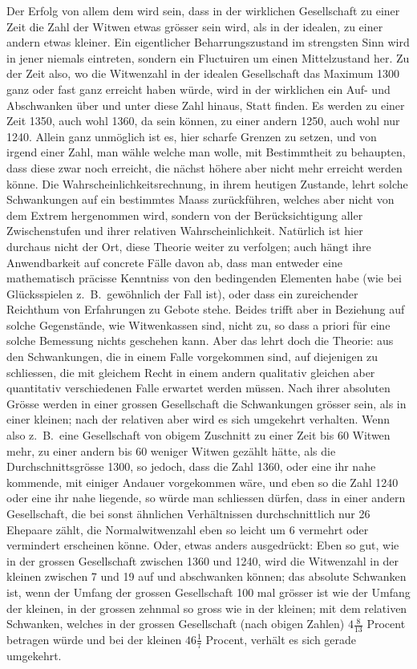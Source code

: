 \documentclass[12pt,a4paper]{article}
\begin{document}
Der Erfolg von allem dem wird sein, dass in der wirklichen Gesellschaft zu einer Zeit die Zahl der Witwen etwas gr\"osser sein wird, als in der idealen, zu einer andern etwas kleiner. Ein eigentlicher Beharrungszustand im strengsten Sinn wird in jener niemals eintreten, sondern ein Fluctuiren um einen Mittelzustand her. Zu der Zeit also, wo die Witwenzahl in der idealen Gesellschaft das Maximum 1300 ganz oder fast ganz erreicht haben w\"urde, wird in der wirklichen ein Auf- und Abschwanken \"uber und unter diese Zahl hinaus, Statt finden. Es werden zu einer Zeit 1350, auch wohl 1360, da sein k\"onnen, zu einer andern 1250, auch wohl nur 1240. Allein ganz unm\"oglich ist es, hier scharfe Grenzen zu setzen, und von irgend einer Zahl, man w\"ahle welche man wolle, mit Bestimmtheit zu behaupten, dass diese zwar noch erreicht, die n\"achst h\"ohere aber nicht mehr erreicht werden k\"onne. Die Wahrscheinlichkeitsrechnung, in ihrem heutigen Zustande, lehrt solche Schwankungen auf ein bestimmtes Maass zur\"uckf\"uhren, welches aber nicht von dem Extrem hergenommen wird, sondern von der Ber\"ucksichtigung aller Zwischenstufen und ihrer relativen Wahrscheinlichkeit. Nat\"urlich ist hier durchaus nicht der Ort, diese Theorie weiter zu verfolgen; auch h\"angt ihre Anwendbarkeit auf concrete F\"alle davon ab, dass man entweder eine mathematisch pr\"acisse Kenntniss von den bedingenden Elementen habe (wie bei Gl\"ucksspielen z.\ B.\ gew\"ohnlich der Fall ist), oder dass ein zureichender Reichthum von Erfahrungen zu Gebote stehe. Beides trifft aber in Beziehung auf solche Gegenst\"ande, wie Witwenkassen sind, nicht zu, so dass a priori f\"ur eine solche Bemessung nichts geschehen kann. Aber das lehrt doch die Theorie: aus den Schwankungen, die in einem Falle vorgekommen sind, auf diejenigen zu schliessen, die mit gleichem Recht in einem andern qualitativ gleichen aber quantitativ verschiedenen Falle erwartet werden m\"ussen. Nach ihrer absoluten Gr\"osse werden in einer grossen Gesellschaft die Schwankungen gr\"osser sein, als in einer kleinen; nach der relativen aber wird es sich umgekehrt verhalten. Wenn also z.\ B.\ eine Gesellschaft von obigem Zuschnitt zu einer Zeit bis 60 Witwen mehr, zu einer andern bis 60 weniger Witwen gez\"ahlt h\"atte, als die Durchschnittsgr\"osse 1300, so jedoch, dass die Zahl 1360, oder eine ihr nahe kommende, mit einiger Andauer vorgekommen w\"are, und eben so die Zahl 1240 oder eine ihr nahe liegende, so w\"urde man schliessen d\"urfen, dass in einer andern Gesellschaft, die bei sonst \"ahnlichen Verh\"altnissen durchschnittlich nur 26 Ehepaare z\"ahlt, die Normalwitwenzahl eben so leicht um 6 vermehrt oder vermindert erscheinen k\"onne. Oder, etwas anders ausgedr\"uckt: Eben so gut, wie in der grossen Gesellschaft zwischen 1360 und 1240, wird die Witwenzahl in der kleinen zwischen 7 und 19 auf und abschwanken k\"onnen; das absolute Schwanken ist, wenn der Umfang der grossen Gesellschaft 100 mal gr\"osser ist wie der Umfang der kleinen, in der grossen zehnmal so gross wie in der kleinen; mit dem relativen Schwanken, welches in der grossen Gesellschaft (nach obigen Zahlen) $4\frac{8}{13}$ Procent betragen w\"urde und bei der kleinen $46\frac{1}{7}$ Procent, verh\"alt es sich gerade umgekehrt.
\end{document}

